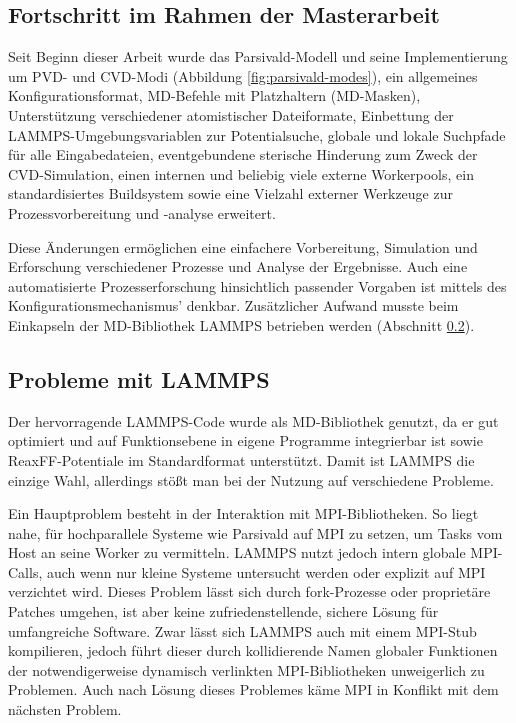 \subsection{Fortschritt im Rahmen der Masterarbeit}

Seit Beginn dieser Arbeit wurde das Parsivald-Modell und seine Implementierung um PVD- und CVD-Modi (Abbildung \ref{fig:parsivald-modes}), ein allgemeines Konfigurationsformat, MD-Befehle mit Platzhaltern (MD-Masken), Unterstützung verschiedener atomistischer Dateiformate, Einbettung der LAMMPS-Umgebungs\-variablen zur Potentialsuche, globale und lokale Suchpfade für alle Eingabedateien, eventgebundene sterische Hinderung zum Zweck der CVD-Simu\-lation, einen internen und beliebig viele externe Workerpools, ein standardisiertes Buildsystem sowie eine Vielzahl externer Werkzeuge zur Prozessvorbereitung und -analyse erweitert.

Diese Änderungen ermöglichen eine einfachere Vorbereitung, Simulation und Erforschung verschiedener Prozesse und Analyse der Ergebnisse.
Auch eine automatisierte Prozesserforschung hinsichtlich passender Vorgaben ist mittels des Konfigurationsmechanismus' denkbar.
Zusätzlicher Aufwand musste beim Einkapseln der MD-Bibliothek LAMMPS betrieben werden (Abschnitt \ref{lammpssucks}).

\subsection{Probleme mit LAMMPS}
\label{lammpssucks}

Der hervorragende LAMMPS-Code wurde als MD-Bibliothek genutzt, da er gut optimiert und auf Funktionsebene in eigene Programme integrierbar ist sowie ReaxFF-Potentiale im Standardformat unterstützt.
Damit ist LAMMPS die einzige Wahl, allerdings stößt man bei der Nutzung auf verschiedene Probleme.

Ein Hauptproblem besteht in der Interaktion mit MPI-Bibliotheken.
So liegt nahe, für hochparallele Systeme wie Parsivald auf MPI zu setzen, um Tasks vom Host an seine Worker zu vermitteln.
LAMMPS nutzt jedoch intern globale MPI-Calls, auch wenn nur kleine Systeme untersucht werden oder explizit auf MPI verzichtet wird.
Dieses Problem lässt sich durch fork-Prozesse oder proprietäre Patches umgehen, ist aber keine zufriedenstellende, sichere Lösung für umfangreiche Software.
Zwar lässt sich LAMMPS auch mit einem MPI-Stub kompilieren, jedoch führt dieser durch kollidierende Namen globaler Funktionen der notwendigerweise dynamisch verlinkten MPI-Bibliotheken unweigerlich zu Problemen.
Auch nach Lösung dieses Problemes käme MPI in Konflikt mit dem nächsten Problem.

